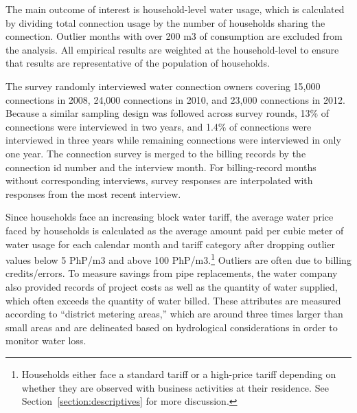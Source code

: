 \documentclass[12pt,table]{article}
\begin{document}
The main outcome of interest is household-level water usage, which is calculated by dividing total connection usage by the number of households sharing the connection.  Outlier months with over 200 m3 of consumption are excluded from the analysis.  All empirical results are weighted at the household-level to ensure that results are representative of the population of households.

The survey randomly interviewed water connection owners covering 15,000 connections in 2008, 24,000 connections in 2010, and 23,000 connections in 2012.  Because a similar sampling design was followed across survey rounds, 13\% of connections were interviewed in two years, and 1.4\% of connections were interviewed in three years while remaining connections were interviewed in only one year.  The connection survey is merged to the billing records by the connection id number and the interview month.  For billing-record months without corresponding interviews, survey responses are interpolated with responses from the most recent interview.

Since households face an increasing block water tariff, the average water price faced by households is calculated as the average  amount paid per cubic meter of water usage for each calendar month and tariff category after dropping outlier values below 5 PhP/m3 and above 100 PhP/m3.\footnote{Households either face a standard tariff or a high-price tariff depending on whether they are observed with business activities at their residence.  See Section~\ref{section:descriptives} for more discussion.}  Outliers are often due to billing credits/errors.  To measure savings from pipe replacements, the water company also provided records of project costs as well as the quantity of water supplied, which often exceeds the quantity of water billed.  These attributes are measured according to ``district metering areas,'' which are around three times larger than small areas and are delineated based on hydrological considerations in order to monitor water loss.






\end{document}
